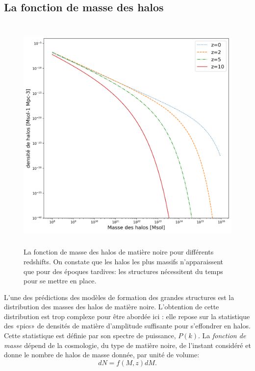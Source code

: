 \subsection{La fonction de masse des halos}
\begin{figure}[htbp]
	\centering
		\includegraphics[height=12cm]{figs/hmf.png}
	\caption[La fonction de masse des halos de matière noire pour différents redshifts]{La fonction de masse des halos de matière noire pour différents redshifts. On constate que les halos les plus massifs n'apparaissent que pour des époques tardives: les structures nécessitent du temps pour se mettre en place.} 
	\label{f:hmf}
\end{figure}
L'une des prédictions des modèles de formation des grandes structures est la distribution des masses des halos de matière noire. L'obtention de cette distribution est trop complexe pour être abordée ici : elle repose sur la statistique des «pics» de densités de matière d'amplitude suffisante pour s'effondrer en halos. Cette statistique est définie par son spectre de puissance, $P(k)$. La \textit{fonction de masse} dépend de la cosmologie, du type de matière noire, de l'instant considéré et donne le nombre de halos de masse donnée, par unité de volume:
\begin{equation}
dN=f(M,z)dM.
\end{equation}
